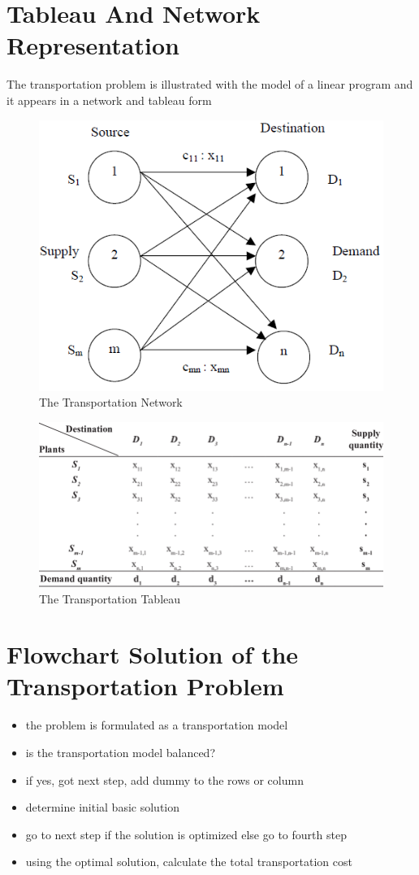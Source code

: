 \documentclass[12pt]{report}
\newcommand{\tp}{Transportation Problem }
\newcommand{\stp}{transportation problem }
\begin{document}
	\section{Tableau And Network Representation}
	The \stp is illustrated with the model of a linear program and it appears in a network and tableau form
	
	\begin{figure}[!h]
		\centering
		\includegraphics[width=0.46\linewidth]{tt}
		\caption{The Transportation Network}
		\label{fg:3_1}
	\end{figure}
	\begin{figure}[!h]
		\centering
		\includegraphics[width=0.65\linewidth]{tt1}
		\caption{The Transportation Tableau}
		\label{fg:3_2}
	\end{figure}
	
	\section{Flowchart Solution of the \tp}
	\begin{itemize}
		\item the problem is formulated as a transportation model
		\item is the transportation model balanced?
		\item if yes, got next step, add dummy to the rows or column
		\item determine initial basic solution
		\item go to next step if the solution is optimized else go to fourth step
		\item using the optimal solution, calculate the total transportation cost
	\end{itemize}
	
\end{document}
